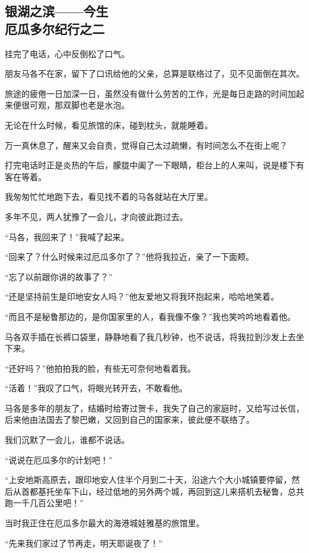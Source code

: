 \subsection{银湖之滨——今生\\\small{厄瓜多尔纪行之二}}

\par 挂完了电话，心中反倒松了口气。
\par 朋友马各不在家，留下了口讯给他的父亲，总算是联络过了，见不见面倒在其次。
\par 旅途的疲倦一日加深一日，虽然没有做什么劳苦的工作，光是每日走路的时间加起来便很可观，那双脚也老是水泡。
\par 无论在什么时候，看见旅馆的床，碰到枕头，就能睡着。
\par 万一真休息了，醒来又会自责，觉得自己太过疏懒，有时间怎么不在街上呢？
\par 打完电话时正是炎热的午后，朦胧中阖了一下眼睛，柜台上的人来叫，说是楼下有客在等着。
\par 我匆匆忙忙地跑下去，看见找不着的马各就站在大厅里。
\par 多年不见，两人犹豫了一会儿，才向彼此跑过去。
\par “马各，我回来了！”我喊了起来。
\par “回来了？什么时候来过厄瓜多尔了？”他将我拉近，亲了一下面颊。
\par “忘了以前跟你讲的故事了？”
\par “还是坚持前生是印地安女人吗？”他友爱地又将我环抱起来，哈哈地笑着。
\par “而且不是秘鲁那边的，是你国家里的人，看我像不像？”我也笑吟吟地看着他。
\par 马各双手插在长裤口袋里，静静地看了我几秒钟，也不说话，将我拉到沙发上去坐下来。
\par “还好吗？”他拍拍我的脸，有些无可奈何地看着我。
\par “活着！”我叹了口气，将眼光转开去，不敢看他。
\par 马各是多年的朋友了，结婚时给寄过贺卡，我失了自己的家庭时，又给写过长信，后来他由法国去了黎巴嫩，又回到自己的国家来，彼此便不联络了。
\par 我们沉默了一会儿，谁都不说话。
\par “说说在厄瓜多尔的计划吧！”
\par “上安地斯高原去，跟印地安人住半个月到二十天，沿途六个大小城镇要停留，然后从首都基托坐车下山，经过低地的另外两个城，再回到这儿来搭机去秘鲁，总共跑一千几百公里吧！”
\par 当时我正住在厄瓜多尔最大的海港城娃雅基的旅馆里。
\par “先来我们家过了节再走，明天耶诞夜了！”
